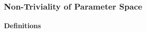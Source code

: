 \begin{frame}
	\frametitle{Non-Triviality of Parameter Space}
	\framesubtitle{Definitions}

	\begin{definition}
	\end{definition}
\end{frame}